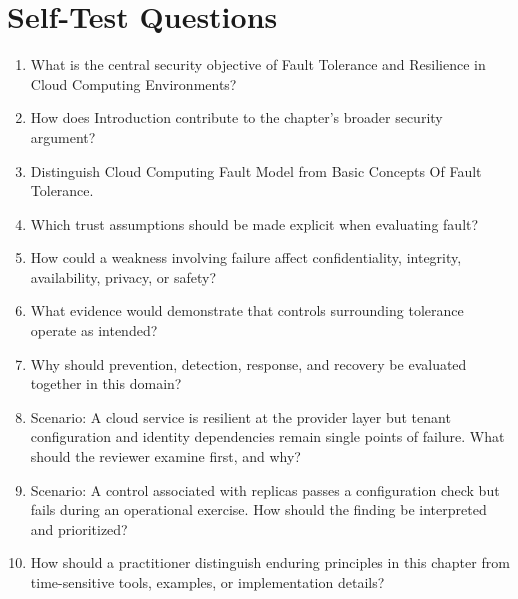 \documentclass[11pt]{article}
\begin{document}
\section*{Self-Test Questions}
\begin{enumerate}
\item What is the central security objective of Fault Tolerance and Resilience in Cloud Computing Environments?
\item How does Introduction contribute to the chapter's broader security argument?
\item Distinguish Cloud Computing Fault Model from Basic Concepts Of Fault Tolerance.
\item Which trust assumptions should be made explicit when evaluating fault?
\item How could a weakness involving failure affect confidentiality, integrity, availability, privacy, or safety?
\item What evidence would demonstrate that controls surrounding tolerance operate as intended?
\item Why should prevention, detection, response, and recovery be evaluated together in this domain?
\item Scenario: A cloud service is resilient at the provider layer but tenant configuration and identity dependencies remain single points of failure. What should the reviewer examine first, and why?
\item Scenario: A control associated with replicas passes a configuration check but fails during an operational exercise. How should the finding be interpreted and prioritized?
\item How should a practitioner distinguish enduring principles in this chapter from time-sensitive tools, examples, or implementation details?
\end{enumerate}
\end{document}
